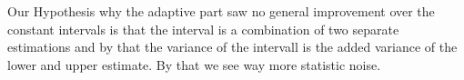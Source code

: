 %
Our Hypothesis why the adaptive part saw no general improvement over the constant intervals is that the interval is a combination of two separate estimations and by that the variance of the intervall is the added variance of the lower and upper estimate. By that we see way more statistic noise. 
